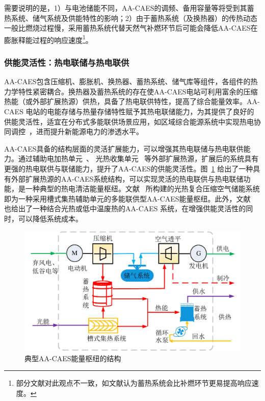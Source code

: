 需要说明的是，1）与电池储能不同，AA-CAES的调频、备用容量等将受到其蓄热系统、储气系统及供能特性的影响\cite{AA-CAES-Reserve-LYW-18}；2）由于蓄热系统（及换热器）的传热动态一般比燃烧过程慢，采用蓄热系统代替天然气补燃环节后可能会降低AA-CAES在膨胀释能过程的响应速度\footnote{部分文献对此观点不一致，如文献认为蓄热系统会比补燃环节更易提高响应速度。}。

\subsubsection{供能灵活性：热电联储与热电联供}
\label{sec:flexibility-poly-generation}
AA-CAES包含压缩机、膨胀机、换热器、蓄热系统、储气库等组件，各组件的热力学特性紧密耦合。换热器及蓄热系统的存在使AA-CAES电站可利用富余的压缩热能（或外部扩展热源）供热，具备了热电联供特性，提高了综合能量效率。AA-CAES 电站的电能存储与热量存储特性赋予其热电联储能力，为其提供了良好的供能灵活性，适宜在分布式多能联供场景应用，如区域综合能源系统中实现热电协同调控~\cite{Trigen-mCAES-15,CAES-Alberta-14}，进而提升新能源电力的渗透水平。

AA-CAES具备的结构层面的灵活扩展能力，可以增强其热电联储与热电联供能力。通过辅助电加热单元~\cite{Hybrid-CAES-14}、 光热收集单元~\cite{EH-CSP-17-Rui,Wind-Solar-CAES-12-Xu} 等外部扩展热源，扩展后的系统具有更强的热电联供与联储能力，提升了AA-CAES的供能灵活性。图~\ref{fig:ST-CAES-Hub} 给出了一种具有外部扩展热源的AA-CAES系统结构，可以实现灵活的热电联供与热电联储功能，是一种典型的热电清洁能量枢纽。文献~ 所构建的光热复合压缩空气储能系统即为一种采用槽式集热辅助单元的多能联供型AA-CAES能量枢纽。此外，文献~ 也给出了一种结合光热或低中温废热的AA-CAES 系统，在增强供能灵活性的同时，可以降低系统成本。

\begin{figure}[H] %
  \centering
  \includegraphics[scale=0.50]{figures/Chap1-3-ST-CAES-Hub.pdf}
  \caption{典型AA-CAES能量枢纽的结构}
  \label{fig:ST-CAES-Hub}
\end{figure}

